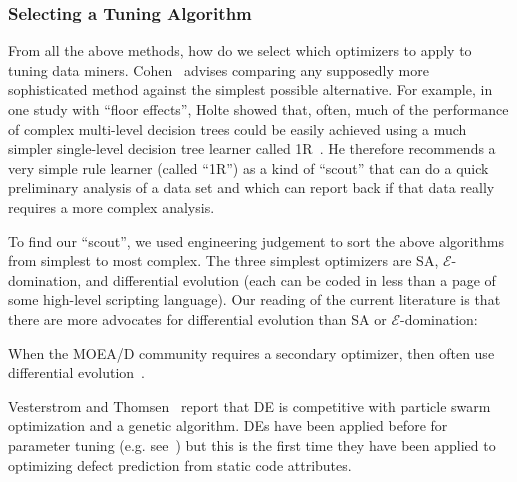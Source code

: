  \subsubsection{Selecting a Tuning Algorithm}
 
From all the above methods, how do we select which optimizers to apply to tuning data miners.
Cohen~\cite{cohen95} advises comparing any supposedly more
sophisticated method against the simplest possible alternative. For
example, in one study with ``floor effects'', Holte showed that,
often, much of the performance of complex multi-level decision trees
could be easily achieved using a much simpler single-level decision
tree learner called 1R~\cite{holte93}. He therefore recommends a very simple rule learner
(called ``1R'') as a
kind of ``scout'' that can do a quick preliminary analysis of a data
set and which can report back if that data really requires a more
complex analysis.

To find our ``scout'',  we used engineering judgement to sort  the above algorithms from simplest to most complex.
The three simplest optimizers are SA, $\mathcal{E}$-domination, and 
differential evolution (each can be coded in less than a page of some high-level scripting language). Our reading of the current literature is that there are more  advocates for
differential evolution than
  SA or $\mathcal{E}$-domination:
  \bi
  \item
  When the MOEA/D community requires a secondary optimizer, then often use  differential evolution~\cite{zhang07,5583335}.
  \item
 Vesterstrom and Thomsen~\cite{Vesterstrom04} report that DE is competitive with 
   particle swarm optimization and a genetic algorithm. 
   \ei
DEs have been applied before for   parameter tuning (e.g. see~\cite{omran2005differential, chiha2012tuning}) but this is the first time they have been applied to
optimizing defect prediction from static code attributes.  


 
 


 
 
